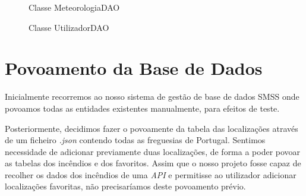\documentclass[a4paper,12pt]{scrreprt}
\newcommand{\tab}{
    \hspace{1cm}}
\begin{document}
\begin{figure}[H]
    \centering
    \caption{Classe MeteorologiaDAO}
\end{figure}

\begin{figure}[H]
    \centering
    \caption{Classe UtilizadorDAO}
\end{figure}

\section{Povoamento da Base de Dados}

\tab Inicialmente recorremos ao nosso sistema de gestão de base de dados SMSS onde povoamos todas as entidades existentes manualmente, para efeitos de teste.

\tab Posteriormente, decidimos fazer o povoamente da tabela das localizações através de um ficheiro \textit{.json} contendo todas as freguesias de Portugal. Sentimos necessidade de adicionar previamente duas localizações, de forma a poder povoar as tabelas dos incêndios e dos favoritos. Assim que o nosso projeto fosse capaz de recolher os dados dos incêndios de uma \textit{API} e permitisse ao utilizador adicionar localizações favoritas, não precisaríamos deste povoamento prévio.
\end{document}
